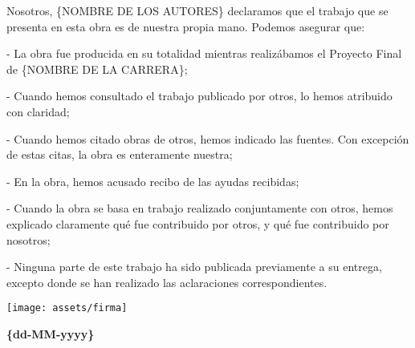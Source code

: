 \thispagestyle{empty}
\newpage
\vspace*{\fill}
        Nosotros, \{NOMBRE DE LOS AUTORES\} declaramos que el trabajo que se presenta en esta obra es de nuestra%
        propia mano. Podemos asegurar que:
        
        - La obra fue producida en su totalidad mientras realizábamos el Proyecto Final de \{NOMBRE DE LA CARRERA\};%
        
        - Cuando hemos consultado el trabajo publicado por otros, lo hemos atribuido con claridad;
        
        - Cuando hemos citado obras de otros, hemos indicado las fuentes. Con excepción de estas citas, la obra es enteramente nuestra;
        
        - En la obra, hemos acusado recibo de las ayudas recibidas;
        
        - Cuando la obra se basa en trabajo realizado conjuntamente con otros, hemos explicado claramente qué fue contribuido por otros, y qué fue contribuido por nosotros;
        
        - Ninguna parte de este trabajo ha sido publicada previamente a su entrega, excepto donde se han realizado las aclaraciones correspondientes.
\bigskip
\begin{center}
\texttt{[image: assets/firma]}
\end{center}


\vspace*{\fill}

\begin{center}
\textbf{\{dd-MM-yyyy\}}%
\end{center}
\newpage